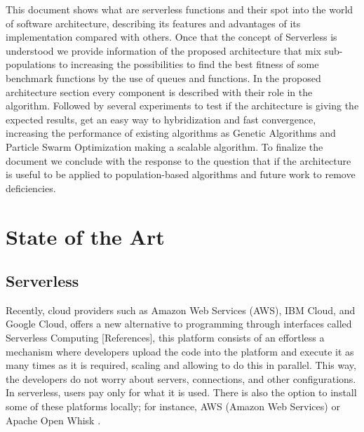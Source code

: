 \documentclass[runningheads]{llncs}
\begin{document}
This document shows what are serverless functions and their spot into the world
of software architecture, describing its features and advantages of its implementation
compared with others. Once that the concept of Serverless is understood we provide 
information of the proposed architecture that mix sub-populations to increasing the 
possibilities to find the best fitness of some benchmark functions by the use of queues and functions.
In the proposed architecture section every component is described with their role in the algorithm.
Followed by several experiments to test if the architecture is giving the expected results, get an easy
way to hybridization and fast convergence, increasing the performance of existing algorithms as Genetic Algorithms
and Particle Swarm Optimization making a scalable algorithm.
To finalize the document we conclude with the response to the question that if the architecture is useful 
to be applied to population-based algorithms and future work to remove deficiencies.


\section{State of the Art}


\subsection{Serverless}


Recently, cloud providers such as Amazon Web Services (AWS), IBM Cloud, and
Google Cloud, offers a new alternative to programming through interfaces called
Serverless Computing [References], this platform consists of an effortless
a mechanism where developers upload the code into the platform and execute it as
many times as it is required, scaling and allowing to do this in parallel. This
way, the developers do not worry about servers, connections, and other
configurations. In serverless, users pay only for what it is used. There is also
the option to install some of these platforms locally; for instance, AWS (Amazon Web Services)
\cite{Baird2016} or Apache Open Whisk \cite{Guerv2018}. 
\end{document}
